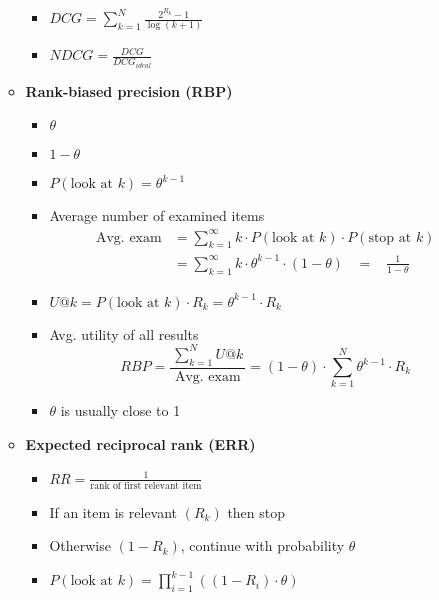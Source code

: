 \begin{itemize}
\begin{itemize}
\begin{itemize}
            \item{ $D C G=\sum_{k=1}^{N} \frac{2^{R_{k}}-1}{\log (k+1)}$}
            \item{ $N D C G=\frac{D C G}{D C G_{i d e a l}}$}
        \end{itemize}
        \item \textbf{\textcolor{Emerald}{Rank-biased precision (RBP)}}
        \begin{itemize}
            \item{ $\theta$}
            \item{ $1 - \theta$}
            \item{ $P(\text{look at } k) = \theta^{k-1}$}
            \item Average number of examined items 
            $$
            \begin{aligned}
            \text{Avg. exam} &=\sum_{k=1}^{\infty} k \cdot P(\text{look at } k) \cdot P(\text{stop at } k) \\
            &=\sum_{k=1}^{\infty} k \cdot \theta^{k-1} \cdot(1-\theta) \;\;\; = \;\;\; \frac{1}{1-\theta}
            \end{aligned}
            $$
            \item{ $U@k =P(\text {look at } k) \cdot R_{k}=\theta^{k-1} \cdot R_{k}$}
            \item Avg. utility of all results  
            $$R B P=\frac{\sum_{k=1}^{N} U @ k}{\text { Avg. exam }}=(1-\theta) \cdot \sum_{k=1}^{N} \theta^{k-1} \cdot R_{k}$$
            \item $\theta$ is usually close to 1
        \end{itemize}
        \newpage
        \item \textbf{\textcolor{Sepia}{Expected reciprocal rank (ERR)}}
        \begin{itemize}
            \item{ $RR = \frac{1}{\text{rank of first relevant item}}$}
            \item If an item is relevant $(R_k)$ then stop
            \item Otherwise $(1 - R_k)$, continue with probability $\theta$
            \item{ $P(\text {look at } k)=\prod_{i=1}^{k-1}\left(\left(1-R_{i}\right) \cdot \theta\right)$}

\end{itemize}
\end{itemize}
\end{itemize}
